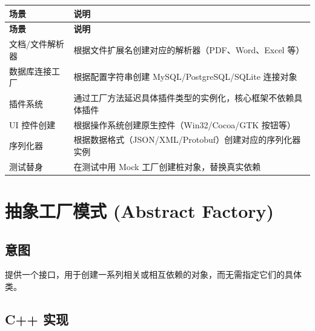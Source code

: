 \documentclass[12pt,a4paper,fontset=fandol]{ctexbook}
\begin{document}
\begin{longtable}{>{\raggedright\arraybackslash}p{4.5cm} >{\raggedright\arraybackslash}p{8.5cm}}
\toprule
\textbf{场景} & \textbf{说明} \\
\midrule
\endfirsthead
\toprule
\textbf{场景} & \textbf{说明} \\
\midrule
\endhead
\bottomrule
\endfoot
文档/文件解析器 & 根据文件扩展名创建对应的解析器（PDF、Word、Excel 等） \\
数据库连接工厂 & 根据配置字符串创建 MySQL/\allowbreak{}\allowbreak{}PostgreSQL/\allowbreak{}\allowbreak{}SQLite 连接对象 \\
插件系统 & 通过工厂方法延迟具体插件类型的实例化，核心框架不依赖具体插件 \\
UI 控件创建 & 根据操作系统创建原生控件（Win32/\allowbreak{}\allowbreak{}Cocoa/\allowbreak{}\allowbreak{}GTK 按钮等） \\
序列化器 & 根据数据格式（JSON/\allowbreak{}\allowbreak{}XML/\allowbreak{}\allowbreak{}Protobuf）创建对应的序列化器实例 \\
测试替身 & 在测试中用 Mock 工厂创建桩对象，替换真实依赖 \\
\end{longtable}

\chapter{抽象工厂模式 (Abstract Factory)}

\section{意图}

提供一个接口，用于创建一系列相关或相互依赖的对象，而无需指定它们的具体类。

\section{C++ 实现}
\end{document}

